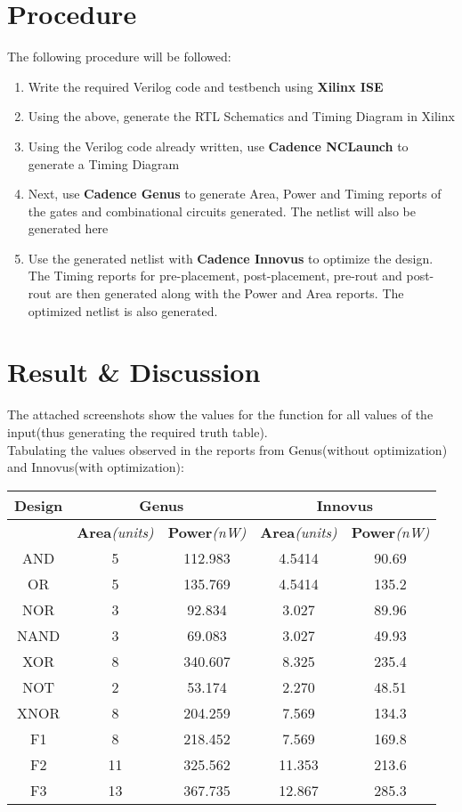 \documentclass[a4paper,11pt]{report}
\begin{document}
\section{Procedure}
The following procedure will be followed:
\begin{enumerate}
\item Write the required Verilog code and testbench using \textbf{Xilinx ISE}
\item Using the above, generate the RTL Schematics and Timing Diagram in Xilinx
\item Using the Verilog code already written, use \textbf{Cadence NCLaunch} to generate a Timing Diagram
\item Next, use \textbf{Cadence Genus} to generate Area, Power and Timing reports of the gates and combinational circuits generated. The netlist will also be generated here
\item Use the generated netlist with \textbf{Cadence Innovus} to optimize the design. The Timing reports for pre-placement, post-placement, pre-rout and post-rout are then generated along with the Power and Area reports. The optimized netlist is also generated.
\end{enumerate}

\section{Result \& Discussion}

The attached screenshots show the values for the function for all values of the input(thus generating the required truth table). \\
Tabulating the values observed in the reports from Genus(without optimization) and Innovus(with optimization): \\

\begin{tabular}{|c|c|c|c|c|}
  \hline
   \textbf{Design} & \multicolumn{2}{|c|}{\textbf{Genus}} & \multicolumn{2}{|c|}{\textbf{Innovus}} \\
   \hline
    & \textbf{Area}\textit{(units)} & \textbf{Power}\textit{(nW)} & \textbf{Area}\textit{(units)} & \textbf{Power}\textit{(nW)} \\
    \hline
    AND & 5 & 112.983 &  4.5414  & 90.69  \\
    \hline
    OR & 5 & 135.769 & 4.5414 & 135.2 \\
    \hline
    NOR & 3 & 92.834 & 3.027 & 89.96 \\
    \hline
    NAND & 3 & 69.083 & 3.027 & 49.93\\
    \hline
    XOR & 8 & 340.607 & 8.325 & 235.4\\
    \hline
    NOT & 2 & 53.174 & 2.270 & 48.51\\
    \hline
    XNOR & 8 & 204.259 & 7.569 & 134.3\\
    \hline
    F1 & 8 & 218.452 & 7.569 & 169.8\\
    \hline
    F2 & 11 & 325.562 & 11.353 & 213.6 \\
    \hline
    F3 & 13 & 367.735 & 12.867 & 285.3 \\
    \hline

\end{tabular} \\
\end{document}
